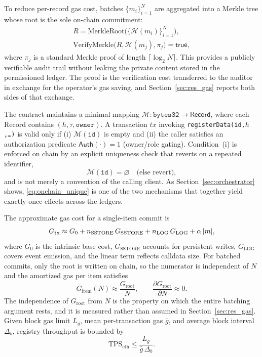 \documentclass[final,5p,times,twocolumn]{elsarticle}
\begin{document}
To reduce per-record gas cost, batches $\{m_i\}_{i=1}^{N}$ are aggregated into a Merkle tree whose root is the sole on-chain commitment:
\begin{subequations}
\begin{gather}
R = \mathrm{MerkleRoot}\!\big(\{\mathcal{H}(m_i)\}_{i=1}^{N}\big), \label{eq:root}\\
\mathrm{VerifyMerkle}\!\big(R,\mathcal{H}(m_j),\pi_j\big)=\textsf{true}, \label{eq:verify}
\end{gather}
\end{subequations}
where $\pi_j$ is a standard Merkle proof of length $\lceil \log_2 N\rceil$. This provides a publicly verifiable audit trail without leaking the private content stored in the permissioned ledger. The proof is the verification cost transferred to the auditor in exchange for the operator's gas saving, and Section~\ref{sec:res_gas} reports both sides of that exchange.

The contract maintains a minimal mapping $\mathcal{M}:\texttt{bytes32}\!\rightarrow\!\textsf{Record}$, where each \textsf{Record} contains $(h,\tau,\texttt{owner})$. A transaction $tx$ invoking \texttt{registerData(id,}$h$\texttt{,\ldots)} is valid only if (i) $\mathcal{M}(\texttt{id})$ is empty and (ii) the caller satisfies an authorization predicate $\mathsf{Auth}(\cdot)=1$ (owner/role gating). Condition~(i) is enforced on chain by an explicit uniqueness check that reverts on a repeated identifier,
\begin{equation}
  \mathcal{M}(\texttt{id}) = \varnothing
  \quad\text{(else revert)},
  \label{eq:onchain_unique}
\end{equation}
and is not merely a convention of the calling client. As Section~\ref{sec:orchestrator} shows, \eqref{eq:onchain_unique} is one of the two mechanisms that together yield exactly-once effects across the ledgers.

The approximate gas cost for a single-item commit is
\begin{equation}
\scriptsize
G_{\text{tx}} \approx G_0
  + n_{\text{SSTORE}}\,G_{\text{SSTORE}}
  + n_{\text{LOG}}\,G_{\text{LOG}}
  + \alpha\,|m|,
\label{eq:gas_single}
\end{equation}
where $G_0$ is the intrinsic base cost, $G_{\text{SSTORE}}$ accounts for persistent writes, $G_{\text{LOG}}$ covers event emission, and the linear term reflects calldata size. For batched commits, only the root is written on chain, so the numerator is independent of $N$ and the amortized gas per item satisfies
\begin{equation}
\bar{G}_{\text{item}}(N)
\approx
\frac{G_{\text{root}}}{N},
\qquad
\frac{\partial G_{\text{root}}}{\partial N}\approx 0.
\label{eq:gas_batch}
\end{equation}
The independence of $G_{\text{root}}$ from $N$ is the property on which the entire batching argument rests, and it is measured rather than assumed in Section~\ref{sec:res_gas}. Given block gas limit $L_g$, mean per-transaction gas $\bar{g}$, and average block interval $\Delta_b$, registry throughput is bounded by
\begin{equation}
\mathrm{TPS}_{\text{eth}}
\le
\frac{L_g}{\bar{g}\,\Delta_b}.
\label{eq:eth_tps}
\end{equation}
\end{document}
